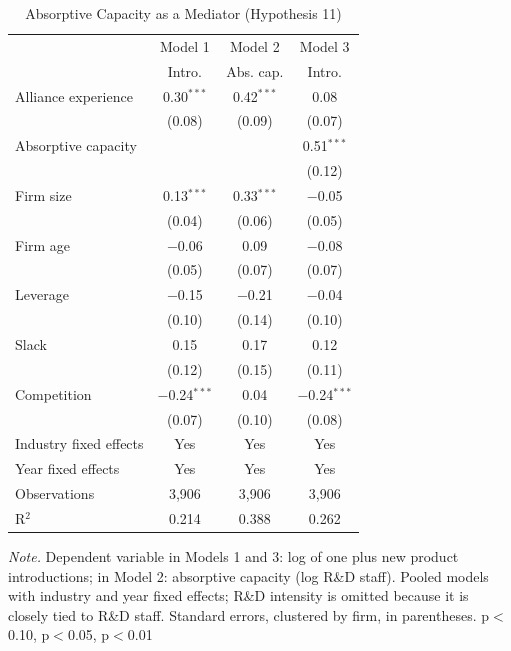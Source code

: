 \documentclass[12pt]{article}
\begin{document}
\begin{table}[p]
\centering\small
\caption{Absorptive Capacity as a Mediator (Hypothesis 11)}
\begin{tabular}{lccc}
\toprule
 & Model 1 & Model 2 & Model 3 \\
 & Intro. & Abs. cap. & Intro. \\
\midrule
Alliance experience & 0.30$^{***}$ & 0.42$^{***}$ & 0.08 \\
 & (0.08) & (0.09) & (0.07) \\[2pt]
Absorptive capacity &  &  & 0.51$^{***}$ \\
 &  &  & (0.12) \\[2pt]
Firm size & 0.13$^{***}$ & 0.33$^{***}$ & $-$0.05 \\
 & (0.04) & (0.06) & (0.05) \\[2pt]
Firm age & $-$0.06 & 0.09 & $-$0.08 \\
 & (0.05) & (0.07) & (0.07) \\[2pt]
Leverage & $-$0.15 & $-$0.21 & $-$0.04 \\
 & (0.10) & (0.14) & (0.10) \\[2pt]
Slack & 0.15 & 0.17 & 0.12 \\
 & (0.12) & (0.15) & (0.11) \\[2pt]
Competition & $-$0.24$^{***}$ & 0.04 & $-$0.24$^{***}$ \\
 & (0.07) & (0.10) & (0.08) \\[2pt]
\midrule
Industry fixed effects & Yes & Yes & Yes \\
Year fixed effects & Yes & Yes & Yes \\
Observations & 3,906 & 3,906 & 3,906 \\
R$^2$ & 0.214 & 0.388 & 0.262 \\
\bottomrule
\end{tabular}
\begin{minipage}{0.92\textwidth}\footnotesize\smallskip
\textit{Note.} Dependent variable in Models 1 and 3: log of one plus new product introductions; in Model 2: absorptive capacity (log R\&D staff). Pooled models with industry and year fixed effects; R\&D intensity is omitted because it is closely tied to R\&D staff. Standard errors, clustered by firm, in parentheses. \textasteriskcentered{} p$<$0.10, \textasteriskcentered{}\textasteriskcentered{} p$<$0.05, \textasteriskcentered{}\textasteriskcentered{}\textasteriskcentered{} p$<$0.01
\end{minipage}
\end{table}
\clearpage
\end{document}
